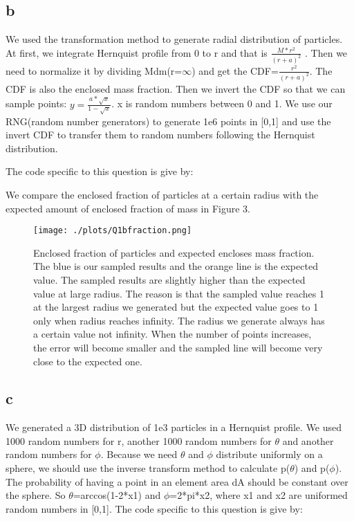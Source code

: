 \subsection{b}
We used the transformation method to generate radial distribution of particles. At first, we integrate Hernquist profile from 0 to r and that is $\frac{M*r^2}{(r+a)^2}$ . Then we need to normalize it by dividing Mdm(r=$\infty$) and get the CDF=$\frac{r^2}{(r+a)^2}$.
The CDF is also the enclosed mass fraction. Then we invert the CDF so that we can sample points: $y=\frac{a*\sqrt{x}}{1-\sqrt{x}}$. x is random numbers between 0 and 1. We use our RNG(random number generators) to generate 1e6 points in [0,1] and use the invert CDF to transfer them to random numbers following the Hernquist distribution.

The code specific to this question is give by:


We compare the enclosed fraction of particles at a certain radius with the expected amount of enclosed fraction of mass in Figure 3.

\begin{figure}[h!]
  \centering
  \texttt{[image: ./plots/Q1bfraction.png]}
  \caption{Enclosed fraction of particles and expected encloses mass fraction. The blue is our sampled results and the orange line is the expected value. The sampled results are slightly higher than the expected value at large radius. The reason is that the sampled value reaches 1 at the largest radius we generated but the expected value goes to 1 only when radius reaches infinity. The radius we generate always has a certain value not infinity. When the number of points increases, the error will become smaller and the sampled line will become very close to the expected one.}
  \label{fig3}
\end{figure}

\subsection{c}
We generated a 3D distribution of 1e3 particles in a Hernquist profile. We used 1000 random numbers for r, another 1000 random numbers for $\theta$ and another random numbers for $\phi$. Because we need $\theta$ and $\phi$ distribute uniformly on a sphere, we should use the inverse transform method to calculate p($\theta$) and p($\phi$). The probability of having a point in an element area dA should be constant over the sphere. So $\theta$=arccos(1-2*x1) and $\phi$=2*pi*x2, where x1 and x2 are uniformed random numbers in [0,1].
The code specific to this question is give by:


